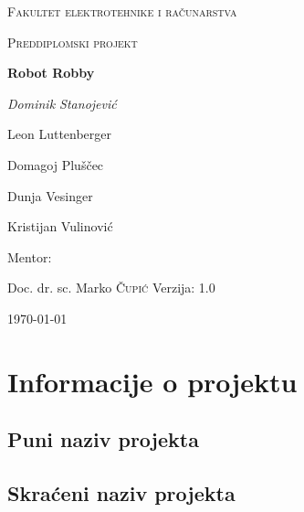 \documentclass[times, utf8, numeric]{fer}
\begin{document}
\begin{titlepage}
	\centering
	{\scshape\LARGE Fakultet elektrotehnike i računarstva \par}
	\vspace{1cm}
	{\scshape\Large Preddiplomski projekt\par}
	\vspace{1.5cm}
	{\huge\bfseries Robot Robby\par}
	\vspace{2cm}
	{\Large\itshape
	Dominik Stanojević \par
	Leon Luttenberger \par
	Domagoj Pluščec \par
	Dunja Vesinger \par
	Kristijan Vulinović\par}
	\vfill
	Mentor:\par
	Doc. dr. sc. Marko \textsc{Čupić}
	\vfill	
	Verzija: 1.0
	\vfill

	{\large \today\par}
\end{titlepage}

\pagebreak
\tableofcontents

\pagebreak
{}

\chapter{Informacije o projektu}
\section{Puni naziv projekta}

\section{Skraćeni naziv projekta}
\end{document}
